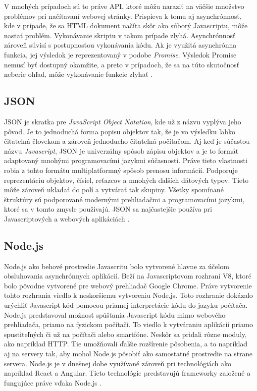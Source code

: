 V mnohých prípadoch sú to práve API, ktoré môžu naraziť na väčšie množstvo problémov pri načítavaní webovej stránky. Prispieva k tomu aj asynchrónnosť, kde v prípade, že sa HTML dokument načíta skôr ako súborý Javascriptu, môže nastať problém. Vykonávanie skriptu v takom prípade zlyhá. Asynchrónnosť zároveň súvisí s postupnosťou vykonávania kódu. Ak je využitá asynchrónna funkcia, jej výsledok je reprezentovaný v podobe \textit{Promise}. Výsledok Promise nemusí byť dostupný okamžite, a preto v prípadoch, že sa na túto skutočnosť neberie ohľad, môže vykonávanie funkcie zlyhať \cite{Javascript}.

\newpage
\subsection{JSON}

JSON je skratka pre \textit{JavaScript Object Notation}, kde už z názvu vyplýva jeho pôvod. Je to jednoduchá forma popisu objektov tak, že je vo výsledku ľahko čitateľná človekom a zároveň jednoducho čitateľná počítačom. Aj keď je súčasťou názvu \textit{Javascript}, JSON je univerzálny spôsob zápisu objektov a je to formát adaptovaný mnohými programovacími jazykmi súčasnosti. Práve tieto vlastnosti robia z tohto formátu multiplatformný spôsob prenosu informácií. Podporuje reprezentáciu objektov, čísiel, reťazcov a mnohých ďalších dátových typov. Tieto môže zároveň ukladať do polí a vytvárať tak skupiny. Všetky spomínané štruktúry sú podporované modernými prehliadačmi a programovacími jazykmi, ktoré sa v tomto zmysle používajú. JSON sa najčastejšie používa pri Javascriptových a webových aplikáciách \cite{JSON}.

\subsection{Node.js}

Node.js ako behové prostredie Javascritu bolo vytvorené hlavne za účelom obsluhovania asynchrónnych aplikácií. Beží na Javascriptovom rozhraní V8, ktoré bolo pôvodne vytvorené pre webový prehliadač Google Chrome. Práve vytvorenie tohto rozhrania viedlo k neskoršiemu vytvoreniu Node.js. Toto rozhranie dokázalo urýchliť Javascript kód pomocou priamej interpretácie kódu do jazyku počítača. Node.js predstavoval možnosť spúšťania Javascript kódu mimo webového prehliadača, priamo na fyzickom počítači. To viedlo k vytváraniu aplikácií priamo spustiteľných či už na počítači alebo smartfóne. Neskôr sa pridali rôzne moduly, ako napríklad HTTP. Tie umožňovali ďalšie rozšírenie pôsobenia, a to napríklad aj na servery tak, aby mohol Node.js pôsobiť ako samostatné prostredie na strane servera. Node.js je v dnešnej dobe využívané zároveň pri technológiách ako napríklad React a Angular. Tieto technológie predstavujú frameworky založené a fungujúce práve vďaka Node.js \cite{Node}.

